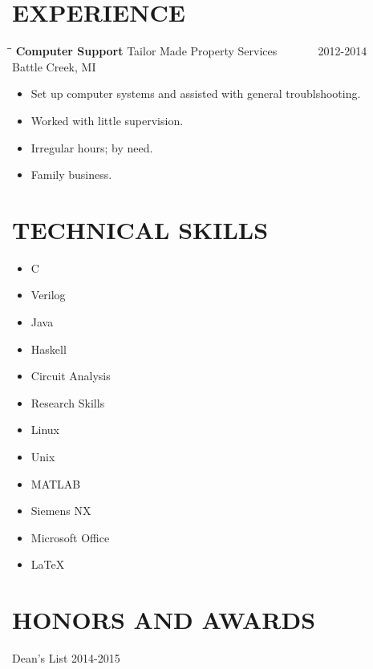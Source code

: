 \documentclass[letterpaper]{res}
\begin{document}
\begin{resume}
\section{EXPERIENCE}
   \vspace{-0.15in}
   \begin{tabbing}
   \hspace{2.3in}\= \hspace{2.6in}\= \kill %
    {\bf Computer Support} \>Tailor Made Property Services \> ~~~~~~ 2012-2014\\
                          \>Battle Creek, MI
   \end{tabbing}\vspace{-10pt}
   \begin{itemize} \itemsep1pt \parskip0pt 
   \item Set up computer systems and assisted with general troublshooting.
   \item Worked with little supervision.
   \item Irregular hours; by need.
   \item Family business.
   \end{itemize}

\section{TECHNICAL SKILLS}
	\vspace{-1pt}
	\begin{multicols}{4}
	\begin{itemize} \itemsep1pt \parskip0pt 
		\item C
		\item Verilog
		\item Java
		\item Haskell
		\item Circuit Analysis
		\item Research Skills
		\item Linux
		\item Unix
		\item MATLAB
		\item Siemens NX
		\item Microsoft Office
		\item LaTeX
	\end{itemize}
	\end{multicols}

\section{HONORS AND AWARDS}
	Dean's List 2014-2015

\end{resume}
\end{document}
